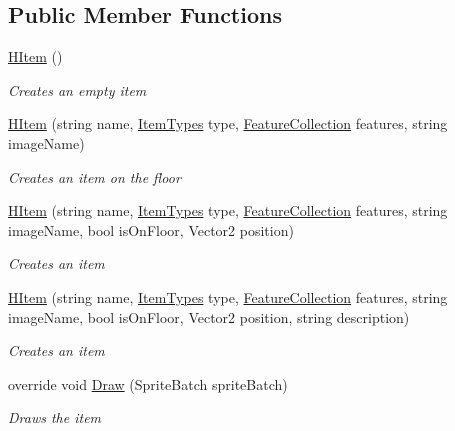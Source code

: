 \subsection*{Public Member Functions}
\begin{DoxyCompactItemize}
\item 
\hyperlink{class_hel_project_1_1_game_world_1_1_h_item_a53ff6613b07fb7edb20fa2a444a07dc8}{H\+Item} ()
\begin{DoxyCompactList}\small\item\em Creates an empty item \end{DoxyCompactList}\item 
\hyperlink{class_hel_project_1_1_game_world_1_1_h_item_a0786795d6c629860dcdd64b9069c87ca}{H\+Item} (string name, \hyperlink{class_hel_project_1_1_game_world_1_1_h_item_a7440e7b22ff0e62bcaf89a513716357b}{Item\+Types} type, \hyperlink{class_hel_project_1_1_features_1_1_feature_collection}{Feature\+Collection} features, string image\+Name)
\begin{DoxyCompactList}\small\item\em Creates an item on the floor \end{DoxyCompactList}\item 
\hyperlink{class_hel_project_1_1_game_world_1_1_h_item_a089cacb678add3aa0de4d2a860a4d3ac}{H\+Item} (string name, \hyperlink{class_hel_project_1_1_game_world_1_1_h_item_a7440e7b22ff0e62bcaf89a513716357b}{Item\+Types} type, \hyperlink{class_hel_project_1_1_features_1_1_feature_collection}{Feature\+Collection} features, string image\+Name, bool is\+On\+Floor, Vector2 position)
\begin{DoxyCompactList}\small\item\em Creates an item \end{DoxyCompactList}\item 
\hyperlink{class_hel_project_1_1_game_world_1_1_h_item_aa6589eba9b17440fdea472c2f0468655}{H\+Item} (string name, \hyperlink{class_hel_project_1_1_game_world_1_1_h_item_a7440e7b22ff0e62bcaf89a513716357b}{Item\+Types} type, \hyperlink{class_hel_project_1_1_features_1_1_feature_collection}{Feature\+Collection} features, string image\+Name, bool is\+On\+Floor, Vector2 position, string description)
\begin{DoxyCompactList}\small\item\em Creates an item \end{DoxyCompactList}\item 
override void \hyperlink{class_hel_project_1_1_game_world_1_1_h_item_a463357f63d56ec3ac4836a224c179892}{Draw} (Sprite\+Batch sprite\+Batch)
\begin{DoxyCompactList}\small\item\em Draws the item \end{DoxyCompactList}\end{DoxyCompactItemize}
